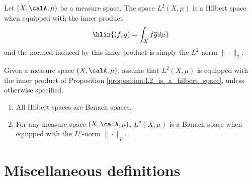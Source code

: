 





\begin{proposition} \label{proposition:L2_is_a_hilbert_space}
    Let $(X,\calA, \mu)$ be a measure space. The space $L^2(X, \mu)$ is a Hilbert space when equipped with the inner product
    $$\hlin{(f, g)=\int_{X} f \overline{g} d \mu}$$
    and the normed induced by this inner product is simply the $L^2$-norm $\|\cdot\|_2$. 
\end{proposition}

\begin{convention} \label{convention:L2_is_a_hilbert_space}
    Given a measure space $(X,\calA, \mu)$, assume that $L^2(X, \mu)$ is equipped with the inner product of Proposition \ref{proposition:L2_is_a_hilbert_space}, unless otherwise specified.
\end{convention}



\begin{proposition}
    \begin{enumerate}
    \item All Hilbert spaces are Banach spaces.
    \item For any measure space $(X, \calA, \mu)$, $L^p(X,\mu)$ is a Banach space when equipped with the $L^p$-norm $\|\cdot\|_p$.
    \end{enumerate}
\end{proposition}


\section{Miscellaneous definitions}











